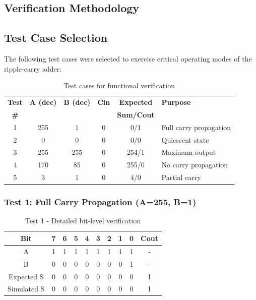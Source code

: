\documentclass[12pt,letterpaper]{article}
\begin{document}

\subsection{Verification Methodology}

\subsection{Test Case Selection}

The following test cases were selected to exercise critical operating modes of the ripple-carry adder:

\begin{table}[H]
\centering
\caption{Test cases for functional verification}
\label{tab:test_cases}
\begin{tabular}{@{}cccccl@{}}
\toprule
\textbf{Test} & \textbf{A (dec)} & \textbf{B (dec)} & \textbf{Cin} & \textbf{Expected} & \textbf{Purpose} \\
\textbf{\#} & & & & \textbf{Sum/Cout} & \\
\midrule
1 & 255 & 1 & 0 & 0/1 & Full carry propagation \\
2 & 0 & 0 & 0 & 0/0 & Quiescent state \\
3 & 255 & 255 & 0 & 254/1 & Maximum output \\
4 & 170 & 85 & 0 & 255/0 & No carry propagation \\
5 & 3 & 1 & 0 & 4/0 & Partial carry \\
\bottomrule
\end{tabular}
\end{table}

\subsubsection{Test 1: Full Carry Propagation (A=255, B=1)}

\begin{table}[H]
\centering
\caption{Test 1 - Detailed bit-level verification}
\begin{tabular}{@{}ccccccccc|c@{}}
\toprule
\textbf{Bit} & \textbf{7} & \textbf{6} & \textbf{5} & \textbf{4} & \textbf{3} & \textbf{2} & \textbf{1} & \textbf{0} & \textbf{Cout} \\
\midrule
A & 1 & 1 & 1 & 1 & 1 & 1 & 1 & 1 & - \\
B & 0 & 0 & 0 & 0 & 0 & 0 & 0 & 1 & - \\
\midrule
Expected S & 0 & 0 & 0 & 0 & 0 & 0 & 0 & 0 & 1 \\
Simulated S & 0 & 0 & 0 & 0 & 0 & 0 & 0 & 0 & 1 \\
\bottomrule
\end{tabular}
\end{table}
\end{document}
